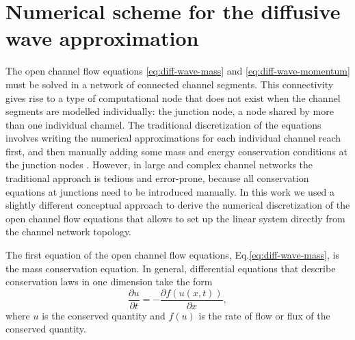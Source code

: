 \documentclass[bg, manuscript]{copernicus}
\begin{document}






\appendix
\section{Numerical scheme for the diffusive wave approximation} \label{ap-difwave}

The open channel flow equations \eqref{eq:diff-wave-mass} and \eqref{eq:diff-wave-momentum} must be solved in a  network of connected channel segments.
This connectivity gives rise to a  type of computational node that does not exist when the channel segments are modelled individually: the junction node, a node shared by more than one individual channel. 
The traditional discretization of the equations  involves writing the numerical approximations for each individual channel reach first, and then manually adding some mass and energy conservation conditions at the junction nodes \citep{cungePracticalAspectsComputational1980, szymkiewiczNumericalModelingOpen2010}.
However, in large and complex channel networks the traditional approach is tedious and error-prone, because all conservation equations at junctions need to   be introduced manually.
In this work we used a slightly different conceptual approach to derive the numerical discretization of the open channel flow equations that allows to set up the linear system directly from the channel network topology.

The first equation of the open channel flow equations, Eq.\eqref{eq:diff-wave-mass}, is the mass conservation equation.
In general, differential equations that describe conservation laws in one dimension take the form
\begin{equation} \label{eq:conservation_pde}
\frac{\partial u}{\partial t} =-\frac{\partial f(u(x,t))}{\partial x},
\end{equation}
where $u$ is the conserved quantity and $f(u)$ is the rate of flow or flux  of the conserved quantity.
\end{document}
